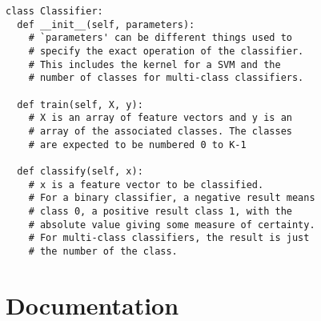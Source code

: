 \documentclass[a4paper, 12pt]{article}
\begin{document}
\begin{lstlisting}[frame=TLbr,breaklines=true]
class Classifier:
  def __init__(self, parameters):
    # `parameters' can be different things used to
    # specify the exact operation of the classifier.
    # This includes the kernel for a SVM and the
    # number of classes for multi-class classifiers.
  
  def train(self, X, y):
    # X is an array of feature vectors and y is an
    # array of the associated classes. The classes
    # are expected to be numbered 0 to K-1
  
  def classify(self, x):
    # x is a feature vector to be classified.
    # For a binary classifier, a negative result means
    # class 0, a positive result class 1, with the
    # absolute value giving some measure of certainty.
    # For multi-class classifiers, the result is just
    # the number of the class.
\end{lstlisting}


\section{Documentation}
\end{document}
